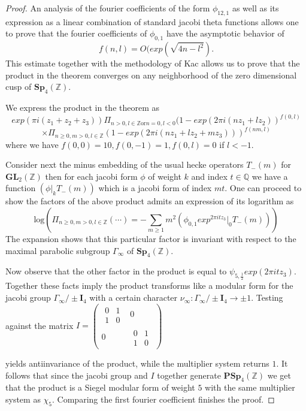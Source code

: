 \documentclass[9pt]{amsart} \usepackage[utf8]{inputenc}
\newcommand{\Q}{\mathbb{Q}}
\newcommand{\Z}{\mathbb{Z}} \newcommand{\C}{\mathbb{C}}
\newcommand{\Sp}{\mathbf{Sp}}
\newcommand{\PSp}{\mathbf{PSp}}
\newcommand{\GL}{\mathbf{GL}}
\newcommand{\Id}{\mathbf{I}}
\begin{document}
\begin{proof}
An analysis of the fourier coefficients of the form $\phi_{12,1}$ as
well as its expression as a linear combination of standard jacobi theta
functions allows one to prove that the fourier coefficients of
$\phi_{0,1}$ have the asymptotic behavior of $$f(n,l) =O(exp(\sqrt{4n
-l^2}).$$ This estimate together with the methodology of Kac\cite{KAC:1}
allows us to prove that the product in the theorem converges on any
neighborhood of the zero dimensional cusp of $\Sp_4(\Z)$.

We express the product in the theorem as $$exp(\pi i(z_1 + z_2 + z_3))
\Pi_{n>0,l\in\Z \textrm{or} n=0, l<0}(1 -exp(2\pi i(nz_1 +
lz_2))^{f(0,l)}$$ $$ \times \Pi_{n\geq0,m>0,l\in\Z}(1 - exp(2\pi i(n z_1 + l
z_2 + m z_3)))^{f(nm,l)}$$ where we have $f(0,0) = 10, f(0,-1) =1,
f(0,l) = 0$ if $l < -1$.


Consider next the minus embedding of the usual hecke operators
$T_{-}(m)$ for $\GL_2(\Z)$ then for each jacobi form $\phi$ of weight
$k$ and index $t \in \Q$ we have a function $(\phi |_k T_{-}(m))$ which
is a jacobi form of index $mt$. One can proceed to show the factors of
the above product admits an expression of its logarithm as
$$\textrm{log}(\Pi_{n\geq 0,m>0,l\in\Z} (\cdots) = - \sum_{m\geq 1} m^2
(\phi_{0,1}exp^{2\pi i t z_3}|_0 T_{-}(m)))$$ The expansion shows that
this particular factor is invariant with respect to the maximal
parabolic subgroup $\Gamma_{\infty}$ of $\Sp_4(\Z)$.

  Now observe that the other factor in the product is equal to
  $\psi_{5,\frac{1}{2}}exp(2\pi i t z_3)$. Together these facts imply
  the product transforms like a modular form for the jacobi group
  $\Gamma_{\infty} / \pm\Id_4$ with a certain character $\nu_{\infty} :
  \Gamma_{\infty} / \pm\Id_4 \rightarrow \pm 1$. Testing against the
  matrix $I = \begin{pmatrix}\begin{matrix}0 & 1\\ 1 & 0\end{matrix} & 0\\ 0 &
  \begin{matrix}0 & 1\\1 & 0\end{matrix}\end{pmatrix}$

  yields antiinvariance  of the product, while the multiplier system
  returns $1$. It follows that since the jacobi group and $I$ together
  generate $\PSp_4(\Z)$ we get that the product is a Siegel modular form
  of weight $5$ with the same multiplier system as $\chi_5$. Comparing
  the first fourier coefficient finishes the proof.


\end{proof}




\end{document}
